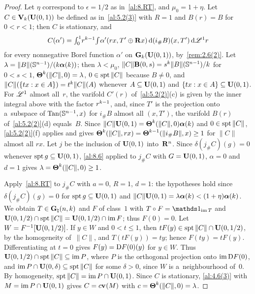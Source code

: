 \begin{proof}
    Let $\eta$ correspond to $\epsilon = 1/2$ as in~\ref{al:8.RT}, and $\mu_0 = 1 + \eta$. Let $C
    \in \mathbf{V}_{k}(\mathbf{U}(0,1))$ be defined as in~\ref{al:5.2(3)} with $R = 1$ and $B(r) = B$ for
    $0 < r < 1$; then $C$ is stationary, and
    \begin{displaymath}
        C(\alpha') = {\textstyle\int_{0}^{1}} r^{k-1} {\textstyle\int_{}^{}} \alpha'(r x, T' \oplus \mathbf{R} x) \,\mathrm{d} (i_\#
        B)(x,T') \,\mathrm{d} \mathscr{L}^1 r
    \end{displaymath}
    for every nonnegative Borel function $\alpha'$ on $\mathbf{G}_{k}(\mathbf{U}(0,1))$, by~\ref{rem:2.6(2)}. Let
    $\lambda = \|B\|(\mathbb{S}^{n-1}) / (k \boldsymbol{\alpha}(k))$; then $\lambda < \mu_0$,
    $\|C\| \mathbf{B}(0,s) = s^{k} \|B\|(\mathbb{S}^{n-1}) / k$ for $0 < s < 1$,
    $\boldsymbol{\Theta}^{k}(\|C\|,0) = \lambda$, $0 \in \operatorname{spt} \|C\|$ because $B \ne 0$, and $\|C\|(\{ t x : x \in A \}) = t^{k} \|C\|(A)$ whenever $A \subseteq
    \mathbf{U}(0,1)$ and $\{ t x : x \in A \} \subseteq \mathbf{U}(0,1)$. For $\mathscr{L}^1$ almost all~$r$, the
    varifold $C'(r)$ of~\ref{al:5.2(2)}(c) is given by the inner integral above with the factor
    $r^{k-1}$, and, since $T'$ is the projection onto a~subspace of $\operatorname{Tan}(\mathbb{S}^{n-1},x)$
    for $i_\# B$ almost all $(x,T')$, the varifold $B(r)$ of~\ref{al:5.2(2)}(d) equals~$B$.
    Since $\|C\| \mathbf{U}(0,1) = \boldsymbol{\Theta}^{k}(\|C\|,0) \boldsymbol{\alpha}(k)$ and $0 \in \operatorname{spt}
    \|C\|$, \ref{al:5.2(2)}(f) applies and gives $\boldsymbol{\Theta}^{k}(\|C\|, r x) =
    \boldsymbol{\Theta}^{k-1}(\|i_\# B\|, x) \ge 1$ for $\|C\|$ almost all $r x$. Let $j$ be the inclusion
    of $\mathbf{U}(0,1)$ into~$\mathbf{R}^{n}$. Since $\delta (j_\# C)(g) = 0$ whenever $\operatorname{spt} g \subseteq
    \mathbf{U}(0,1)$, \ref{al:8.6} applied to $j_\# C$ with $G = \mathbf{U}(0,1)$, $\alpha = 0$ and $d =
    1$ gives $\lambda = \boldsymbol{\Theta}^{k}(\|C\|,0) \ge 1$.

    Apply~\ref{al:8.RT} to $j_\# C$ with $a = 0$, $R = 1$, $d = 1$: the hypotheses hold since $\delta (j_\# C)(g) = 0$ for $\operatorname{spt} g \subseteq \mathbf{U}(0,1)$ and
    $\|C\| \mathbf{U}(0,1) = \lambda \boldsymbol{\alpha}(k) < (1 + \eta) \boldsymbol{\alpha}(k)$. We obtain $T
    \in \mathbf{G}_{\natural}(n,k)$ and $F$ of class~$1$ with $T \circ F = \id{\im T}$ and
    $\mathbf{U}(0,1/2) \cap \operatorname{spt} \|C\| = \mathbf{U}(0,1/2) \cap \operatorname{im} F$; thus $F(0) = 0$. Let $W =
    F^{-1}[\mathbf{U}(0,1/2)]$. If $y \in W$ and $0 < t \le 1$, then $t F(y) \in \operatorname{spt} \|C\| \cap
    \mathbf{U}(0,1/2)$, by the homogeneity of~$\|C\|$, and $T(t F(y)) = t y$; hence $F(t y) = t F(y)$.
    Differentiating at $t = 0$ gives $F(y) = \mathrm{D} F(0)(y)$ for $y \in W$. Thus $\mathbf{U}(0,1/2) \cap
    \operatorname{spt} \|C\| \subseteq \operatorname{im} P$, where $P$ is the orthogonal projection onto $\operatorname{im} \mathrm{D} F(0)$, and $\operatorname{im}
    P \cap \mathbf{U}(0,\delta) \subseteq \operatorname{spt} \|C\|$ for some $\delta > 0$, since $W$ is
    a~neighbourhood of~$0$. By homogeneity, $\operatorname{spt} \|C\| = \operatorname{im} P \cap \mathbf{U}(0,1)$. Since $C$ is
    stationary, \ref{al:4.6(3)} with $M = \operatorname{im} P \cap \mathbf{U}(0,1)$ gives $C = c \mathbf{v}_{}(M)$ with $c
    = \boldsymbol{\Theta}^{k}(\|C\|,0) = \lambda$.


\end{proof}
